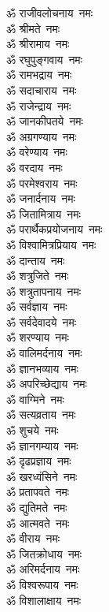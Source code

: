 




\begin{multicols}{2}
\begin{flushleft}
ॐ राजीवलोचनाय~नमः\\
ॐ श्रीमते~नमः\\
ॐ श्रीरामाय~नमः\\
ॐ रघुपुङ्गवाय~नमः\\
ॐ रामभद्राय~नमः\\
ॐ सदाचाराय~नमः\\
ॐ राजेन्द्राय~नमः\\
ॐ जानकीपतये~नमः\\
ॐ अग्रगण्याय~नमः\\
ॐ वरेण्याय~नमः\hfill{}\\
ॐ वरदाय~नमः\\
ॐ परमेश्वराय~नमः\\
ॐ जनार्दनाय~नमः\\
ॐ जितामित्राय~नमः\\
ॐ परार्थैकप्रयोजनाय~नमः\\
ॐ विश्वामित्रप्रियाय~नमः\\
ॐ दान्ताय~नमः\\
ॐ शत्रुजिते~नमः\\
ॐ शत्रुतापनाय~नमः\\
ॐ सर्वज्ञाय~नमः\hfill{}\\
ॐ सर्वदेवादये~नमः\\
ॐ शरण्याय~नमः\\
ॐ वालिमर्दनाय~नमः\\
ॐ ज्ञानभव्याय~नमः\\
ॐ अपरिच्छेद्याय~नमः\\
ॐ वाग्मिने~नमः\\
ॐ सत्यव्रताय~नमः\\
ॐ शुचये~नमः\\
ॐ ज्ञानगम्याय~नमः\\
ॐ दृढप्रज्ञाय~नमः\hfill{}\\
ॐ खरध्वंसिने~नमः\\
ॐ प्रतापवते~नमः\\
ॐ द्युतिमते~नमः\\
ॐ आत्मवते~नमः\\
ॐ वीराय~नमः\\
ॐ जितक्रोधाय~नमः\\
ॐ अरिमर्दनाय~नमः\\
ॐ विश्वरूपाय~नमः\\
ॐ विशालाक्षाय~नमः\\

\end{flushleft}
\end{multicols}
